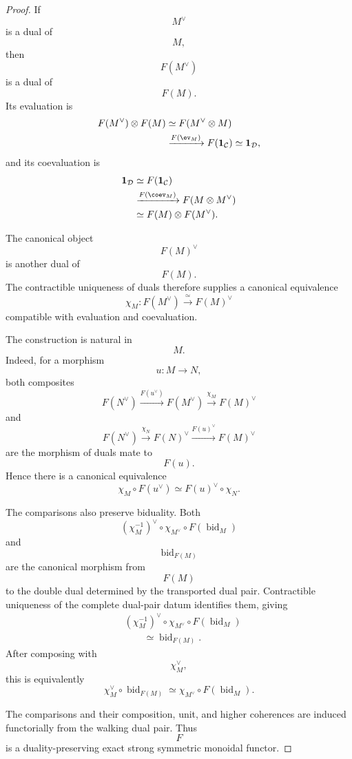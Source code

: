 \begin{proof}
If
\[
    M^\vee
\]
is a dual of
\[
    M,
\]
then
\[
    F(M^\vee)
\]
is a dual of
\[
    F(M).
\]
Its evaluation is
\[
\begin{aligned}
    F(M^\vee)\otimes F(M)
    &\simeq
    F(M^\vee\otimes M)
    \\
    &\xrightarrow{F(\ev_M)}
    F(\mathbf 1_{\mathcal C})
    \simeq
    \mathbf 1_{\mathcal D},
\end{aligned}
\]
and its coevaluation is
\[
\begin{aligned}
    \mathbf 1_{\mathcal D}
    &\simeq
    F(\mathbf 1_{\mathcal C})
    \\
    &\xrightarrow{F(\coev_M)}
    F(M\otimes M^\vee)
    \\
    &\simeq
    F(M)\otimes F(M^\vee).
\end{aligned}
\]

The canonical object
\[
    F(M)^\vee
\]
is another dual of
\[
    F(M).
\]
The contractible uniqueness of duals therefore supplies a canonical
equivalence
\[
    \chi_M
    \colon
    F(M^\vee)
    \xrightarrow{\;\simeq\;}
    F(M)^\vee
\]
compatible with evaluation and coevaluation.

The construction is natural in
\[
    M.
\]
Indeed, for a morphism
\[
    u
    \colon
    M
    \longrightarrow
    N,
\]
both composites
\[
    F(N^\vee)
    \xrightarrow{F(u^\vee)}
    F(M^\vee)
    \xrightarrow{\chi_M}
    F(M)^\vee
\]
and
\[
    F(N^\vee)
    \xrightarrow{\chi_N}
    F(N)^\vee
    \xrightarrow{F(u)^\vee}
    F(M)^\vee
\]
are the morphism of duals mate to
\[
    F(u).
\]
Hence there is a canonical equivalence
\[
    \chi_M
    \circ
    F(u^\vee)
    \simeq
    F(u)^\vee
    \circ
    \chi_N.
\]

The comparisons also preserve biduality. Both
\[
    (\chi_M^{-1})^\vee
    \circ
    \chi_{M^\vee}
    \circ
    F(\operatorname{bid}_M)
\]
and
\[
    \operatorname{bid}_{F(M)}
\]
are the canonical morphism from
\[
    F(M)
\]
to the double dual determined by the transported dual pair. Contractible
uniqueness of the complete dual-pair datum identifies them, giving
\[
\begin{aligned}
    &
    (\chi_M^{-1})^\vee
    \circ
    \chi_{M^\vee}
    \circ
    F(\operatorname{bid}_M)
    \\
    &\qquad\simeq
    \operatorname{bid}_{F(M)}.
\end{aligned}
\]
After composing with
\[
    \chi_M^\vee,
\]
this is equivalently
\[
    \chi_M^\vee
    \circ
    \operatorname{bid}_{F(M)}
    \simeq
    \chi_{M^\vee}
    \circ
    F(\operatorname{bid}_M).
\]

The comparisons and their composition, unit, and higher coherences are
induced functorially from the walking dual pair. Thus
\[
    F
\]
is a duality-preserving exact strong symmetric monoidal functor.
\end{proof}


